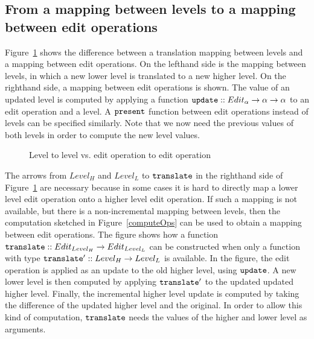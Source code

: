 %																
\subsection{From a mapping between levels to a mapping between edit operations}

Figure~\ref{fromLevelToOp} shows the difference between a translation mapping between levels and a mapping between edit operations. On the lefthand side is the mapping between levels, in which a new lower level is translated to a new higher level. On the righthand side, a mapping between edit operations is shown. The value of an updated level is computed by applying a function
 ${\tt update} :: Edit_\alpha \rightarrow \alpha \rightarrow \alpha$ to an edit operation and a level. A 
 ${\tt present}$ function between edit operations instead of levels can be specified similarly.  Note that we now need the previous values of both levels in order to compute the new level values.
 

\begin{figure}\begin{small}\begin{center}\begin{center}
\end{center}
\caption{Level to level vs. edit operation to edit operation }\label{fromLevelToOp} 
\end{center}\end{small}\end{figure}


The arrows from ${Level_{H}}$ and ${Level_{L}}$ to ${\tt translate}$ in the righthand side of Figure~\ref{fromLevelToOp} are necessary because in some cases it is hard to directly map a lower level edit operation onto a higher level edit operation.  If such a mapping is not available, but there is a non-incremental mapping between levels, then the computation sketched in Figure~\ref{computeOps} can be used to obtain a mapping between edit operations. The figure shows how a function 
${\tt translate} :: Edit_{Level_{H}} \rightarrow Edit_{Level_{L}}$ can be constructed when only a function with type ${\tt translate'} :: Level_{H} \rightarrow Level_{L}$  is available. In the figure, the edit operation is applied as an update to the old higher level, using ${\tt update}$. A new lower level is then computed by applying ${\tt translate'}$ to the updated updated higher level. Finally, the incremental higher level update is computed by taking the difference of the updated higher level and the original. In order to allow this kind of computation, ${\tt translate}$ needs the values of the higher and lower level as arguments.


